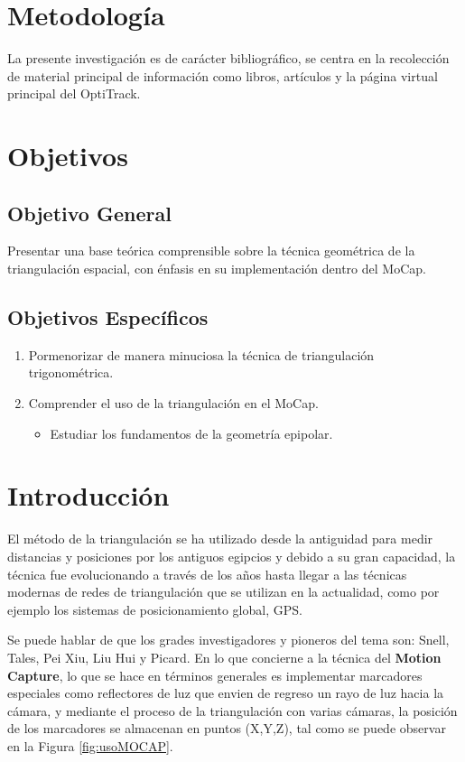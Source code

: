 \documentclass[11pt,letterpaper]{article}     %
\begin{document}
\section{Metodolog\' ia}
La presente investigaci\' on es de car\' acter bibliogr\' afico, se centra en la recolecci\' on de material principal  de informaci\' on como libros, art\' iculos y la p\' agina virtual principal del OptiTrack.

\section{Objetivos}
\subsection{Objetivo General}
Presentar una base te\' orica comprensible sobre la t\' ecnica geom\' etrica de la triangulaci\' on espacial, con \' enfasis en su implementaci\' on dentro del MoCap.
\subsection{Objetivos Espec\' ificos} 
\begin{enumerate}
\item Pormenorizar de manera minuciosa la t\' ecnica  de triangulaci\' on trigonom\' etrica.

\item Comprender el uso de la triangulaci\' on en el MoCap.
\begin{itemize}
\item Estudiar los fundamentos de la geometr\' ia epipolar.
\end{itemize}
\end{enumerate}

\section{Introducci\' on}

El m\' etodo de la triangulaci\' on se ha utilizado desde la antiguidad para medir distancias y posiciones por los antiguos egipcios y debido a su gran capacidad, la t\' ecnica fue evolucionando a trav\' es de los a\~ nos hasta llegar a las t\' ecnicas modernas de redes de triangulaci\' on que se utilizan en la actualidad, como por ejemplo los sistemas de posicionamiento global, GPS.

Se puede hablar de que los grades investigadores y pioneros del tema son: Snell, Tales, Pei Xiu, Liu Hui y Picard.
En lo que concierne a la t\' ecnica del \textbf{Motion Capture}, lo que se hace en t\' erminos generales es implementar marcadores especiales como reflectores de luz que envien de regreso un rayo de luz hacia la c\' amara, y mediante el proceso de la triangulaci\' on con varias c\' amaras, la posici\' on de los marcadores se almacenan en puntos (X,Y,Z), tal como se puede observar en la Figura \ref{fig:usoMOCAP}.
\end{document}
